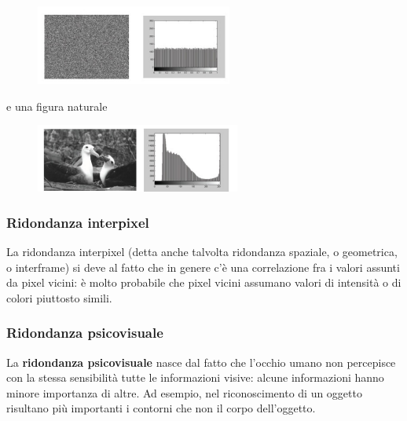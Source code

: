 \begin{figure}[H]
    \centering
    \includegraphics[width=\linewidth, keepaspectratio]{capitoli/immagini/imgs/ridondanza-codifica.png}
\end{figure}

e una figura naturale

\begin{figure}[H]
    \centering
    \includegraphics[width=\linewidth, keepaspectratio]{capitoli/immagini/imgs/ridondanza-codifica2.png}
\end{figure}

\subsubsection{Ridondanza interpixel}
La ridondanza interpixel (detta anche talvolta ridondanza spaziale, o geometrica, o interframe) si deve al fatto che in genere c'è una correlazione fra i valori assunti da pixel vicini:
è molto probabile che pixel vicini assumano valori di intensità o di colori piuttosto simili.

\subsubsection{Ridondanza psicovisuale}
La \textbf{ridondanza psicovisuale} nasce dal fatto che l'occhio umano non percepisce con la stessa sensibilità tutte le informazioni visive: alcune informazioni hanno minore importanza di altre.
Ad esempio, nel riconoscimento di un oggetto risultano più importanti i contorni che non il corpo dell'oggetto.

